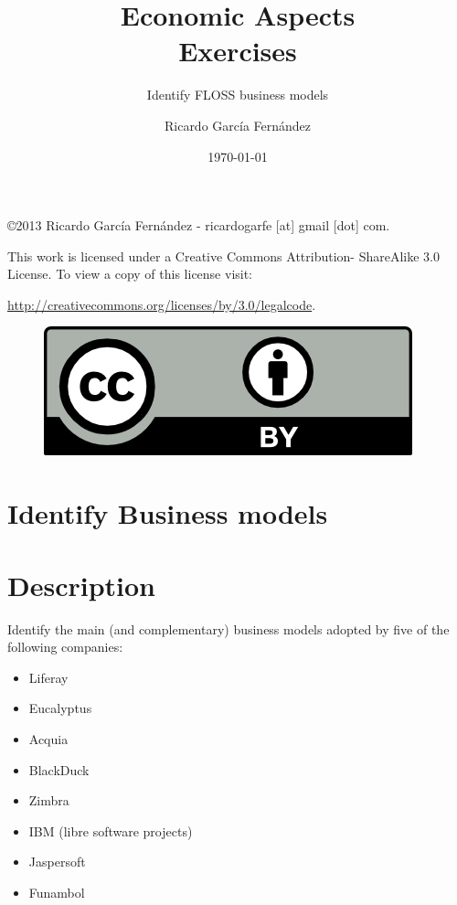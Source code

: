\documentclass[11pt]{scrartcl}
\title{\textbf{Economic Aspects\\
                Exercises}}
\subtitle{Identify FLOSS business models}
\author{Ricardo Garc\'ia Fern\'andez}
\date{\today}
\begin{document}
\maketitle

\vfill

\begin{flushright}
    \copyright  2013 Ricardo Garc\'ia Fern\'andez - ricardogarfe [at] gmail [dot] com.

    This work is licensed under a Creative Commons Attribution- ShareAlike 3.0 License.
    To view a copy of this license visit:
 
    \url{http://creativecommons.org/licenses/by/3.0/legalcode}.
\end{flushright}

\begin{figure}[h]
    \begin{flushright}	
        \includegraphics{by}
        \label{fig:by-sa}
    \end{flushright}
\end{figure}

\newpage

\section{Identify Business models}

\section{Description}

\par Identify the main (and complementary) business models adopted by five of the following companies:

\begin{itemize}
  \item Liferay
  \item Eucalyptus
  \item Acquia
  \item BlackDuck
  \item Zimbra
  \item IBM (libre software projects)
  \item Jaspersoft
  \item Funambol
\end{itemize}
\end{document}

